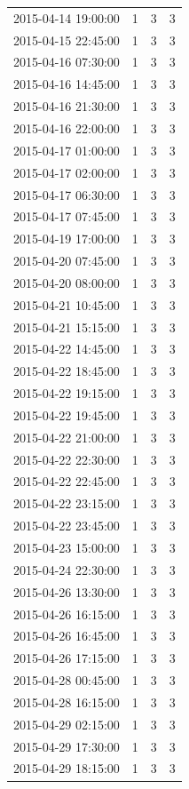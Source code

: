\begin{tabular}{lrrr}
2015-04-14 19:00:00 & 1 & 3 & 3 \\
2015-04-15 22:45:00 & 1 & 3 & 3 \\
2015-04-16 07:30:00 & 1 & 3 & 3 \\
2015-04-16 14:45:00 & 1 & 3 & 3 \\
2015-04-16 21:30:00 & 1 & 3 & 3 \\
2015-04-16 22:00:00 & 1 & 3 & 3 \\
2015-04-17 01:00:00 & 1 & 3 & 3 \\
2015-04-17 02:00:00 & 1 & 3 & 3 \\
2015-04-17 06:30:00 & 1 & 3 & 3 \\
2015-04-17 07:45:00 & 1 & 3 & 3 \\
2015-04-19 17:00:00 & 1 & 3 & 3 \\
2015-04-20 07:45:00 & 1 & 3 & 3 \\
2015-04-20 08:00:00 & 1 & 3 & 3 \\
2015-04-21 10:45:00 & 1 & 3 & 3 \\
2015-04-21 15:15:00 & 1 & 3 & 3 \\
2015-04-22 14:45:00 & 1 & 3 & 3 \\
2015-04-22 18:45:00 & 1 & 3 & 3 \\
2015-04-22 19:15:00 & 1 & 3 & 3 \\
2015-04-22 19:45:00 & 1 & 3 & 3 \\
2015-04-22 21:00:00 & 1 & 3 & 3 \\
2015-04-22 22:30:00 & 1 & 3 & 3 \\
2015-04-22 22:45:00 & 1 & 3 & 3 \\
2015-04-22 23:15:00 & 1 & 3 & 3 \\
2015-04-22 23:45:00 & 1 & 3 & 3 \\
2015-04-23 15:00:00 & 1 & 3 & 3 \\
2015-04-24 22:30:00 & 1 & 3 & 3 \\
2015-04-26 13:30:00 & 1 & 3 & 3 \\
2015-04-26 16:15:00 & 1 & 3 & 3 \\
2015-04-26 16:45:00 & 1 & 3 & 3 \\
2015-04-26 17:15:00 & 1 & 3 & 3 \\
2015-04-28 00:45:00 & 1 & 3 & 3 \\
2015-04-28 16:15:00 & 1 & 3 & 3 \\
2015-04-29 02:15:00 & 1 & 3 & 3 \\
2015-04-29 17:30:00 & 1 & 3 & 3 \\
2015-04-29 18:15:00 & 1 & 3 & 3 \\

\end{tabular}
